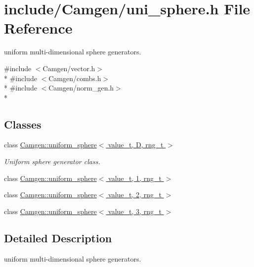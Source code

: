 \hypertarget{a00797}{\section{include/\-Camgen/uni\-\_\-sphere.h File Reference}
\label{a00797}
}


uniform multi-\/dimensional sphere generators.  


{\ttfamily \#include $<$Camgen/vector.\-h$>$}\\*
{\ttfamily \#include $<$Camgen/combs.\-h$>$}\\*
{\ttfamily \#include $<$Camgen/norm\-\_\-gen.\-h$>$}\\*
\subsection*{Classes}
\begin{DoxyCompactItemize}
\item 
class \hyperlink{a00549}{Camgen\-::uniform\-\_\-sphere$<$ value\-\_\-t, D, rng\-\_\-t $>$}
\begin{DoxyCompactList}\small\item\em Uniform sphere generator class. \end{DoxyCompactList}\item 
class \hyperlink{a00550}{Camgen\-::uniform\-\_\-sphere$<$ value\-\_\-t, 1, rng\-\_\-t $>$}
\item 
class \hyperlink{a00551}{Camgen\-::uniform\-\_\-sphere$<$ value\-\_\-t, 2, rng\-\_\-t $>$}
\item 
class \hyperlink{a00552}{Camgen\-::uniform\-\_\-sphere$<$ value\-\_\-t, 3, rng\-\_\-t $>$}
\end{DoxyCompactItemize}


\subsection{Detailed Description}
uniform multi-\/dimensional sphere generators. 